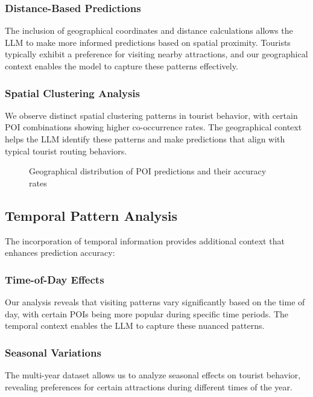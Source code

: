 \documentclass[12pt,a4paper]{article}
\begin{document}
\subsubsection{Distance-Based Predictions}
The inclusion of geographical coordinates and distance calculations allows the LLM to make more informed predictions based on spatial proximity. Tourists typically exhibit a preference for visiting nearby attractions, and our geographical context enables the model to capture these patterns effectively.

\subsubsection{Spatial Clustering Analysis}
We observe distinct spatial clustering patterns in tourist behavior, with certain POI combinations showing higher co-occurrence rates. The geographical context helps the LLM identify these patterns and make predictions that align with typical tourist routing behaviors.

\begin{figure}[H]
\centering
\caption{Geographical distribution of POI predictions and their accuracy rates}
\label{fig:geographical_analysis}
\end{figure}

\subsection{Temporal Pattern Analysis}

The incorporation of temporal information provides additional context that enhances prediction accuracy:

\subsubsection{Time-of-Day Effects}
Our analysis reveals that visiting patterns vary significantly based on the time of day, with certain POIs being more popular during specific time periods. The temporal context enables the LLM to capture these nuanced patterns.

\subsubsection{Seasonal Variations}
The multi-year dataset allows us to analyze seasonal effects on tourist behavior, revealing preferences for certain attractions during different times of the year.
\end{document}
